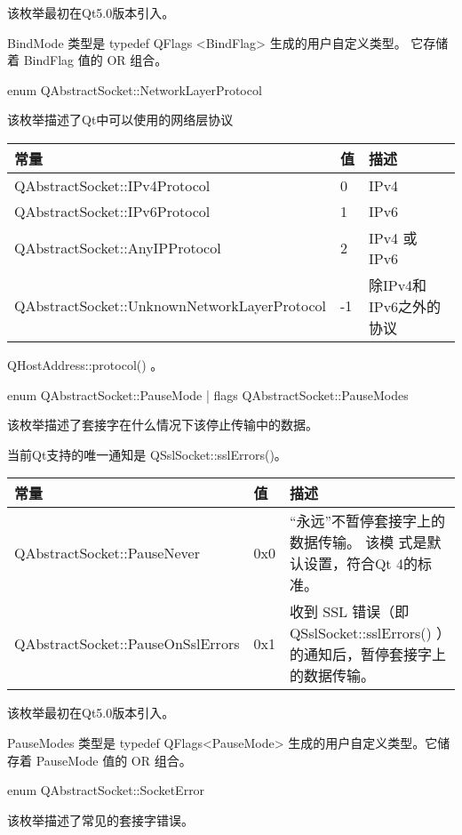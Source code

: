 该枚举最初在Qt5.0版本引入。

BindMode 类型是 typedef QFlags <BindFlag> 生成的用户自定义类型。 它存储着 BindFlag 值的 OR 组合。

enum QAbstractSocket::NetworkLayerProtocol

该枚举描述了Qt中可以使用的网络层协议

\begin{tabular}{|m{26em}|m{2em}|m{8em}|}
\hline
常量&值&描述 \\
\hline
QAbstractSocket::IPv4Protocol&	0	&IPv4\\
\hline
QAbstractSocket::IPv6Protocol&	1	&IPv6\\
\hline
QAbstractSocket::AnyIPProtocol&	2	&IPv4 或 IPv6\\
\hline
QAbstractSocket::UnknownNetworkLayerProtocol&	-1	&除IPv4和IPv6之外的协议\\
\hline
\end{tabular}

\begin{seeAlso}
QHostAddress::protocol() 。
\end{seeAlso}

enum QAbstractSocket::PauseMode | flags QAbstractSocket::PauseModes

该枚举描述了套接字在什么情况下该停止传输中的数据。 

当前Qt支持的唯一通知是 QSslSocket::sslErrors()。

\begin{tabular}{|m{19em}|m{2em}|m{18em}|}
\hline
常量	&值&	描述\\
\hline
QAbstractSocket::PauseNever&	0x0&	“永远”不暂停套接字上的数据传输。 该模
  式是默认设置，符合Qt 4的标准。\\
\hline
QAbstractSocket::PauseOnSslErrors&	0x1&	收到 SSL 错误（即 QSslSocket::sslErrors() ）的通知后，暂停套接字上的数据传输。\\
\hline
\end{tabular}

该枚举最初在Qt5.0版本引入。

PauseModes 类型是 typedef QFlags<PauseMode> 生成的用户自定义类型。它储存着 PauseMode 值的 OR 组合。

enum QAbstractSocket::SocketError

该枚举描述了常见的套接字错误。

